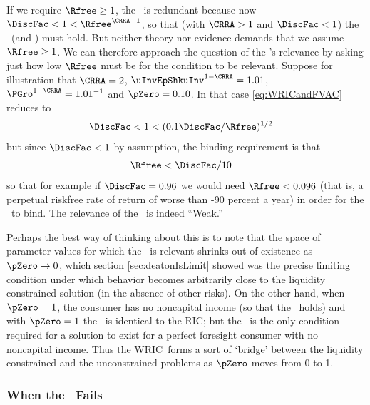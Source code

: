 \documentclass[BufferStockTheory]{subfiles}
\begin{document}
If we require $\Rfree \geq 1$, the \WRIC~is redundant because now $\DiscFac <1<\Rfree^{\CRRA-1}$, so that (with $\CRRA > 1$ and $\DiscFac<1$) the \RIC~(and \WRIC) must hold.  But neither theory nor evidence demands that we assume $\Rfree \geq
1$.  We can therefore approach the question of the \WRIC's relevance by
asking just how low $\Rfree$ must be for the condition to be relevant.
Suppose for illustration that $\CRRA=2$, $\uInvEpShkuInv^{1-\CRRA}=1.01$,
$\PGro^{1-\CRRA}=1.01^{-1}$ and $\pZero = 0.10$.  In that case
\eqref{eq:WRICandFVAC} reduces to
\begin{align*}
  \DiscFac  & < 1 < (0.1 \DiscFac/\Rfree)^{1/2} 
\end{align*}
but since $\DiscFac < 1$ by assumption, the binding requirement is that
\begin{align*}
  \Rfree  & < \DiscFac/10 \notag
\end{align*}
so that for example if $\DiscFac=0.96$ we would need $\Rfree < 0.096$
(that is, a perpetual riskfree rate of return of worse than -90
percent a year) in order for the \WRIC~to bind.
The relevance of the \WRIC~is indeed ``Weak.''

Perhaps the best way of thinking about this is to note that the space
of parameter values for which the \WRIC~is relevant shrinks out of
existence as $\pZero \rightarrow 0$, which section
\ref{sec:deatonIsLimit} showed was the precise limiting condition
under which behavior becomes arbitrarily close to the liquidity
constrained solution (in the absence of other risks).  On the other
hand, when $\pZero = 1$, the consumer has no noncapital income (so
that the \FHWC~holds) and with $\pZero=1$ the \WRIC~is identical to the
RIC; but the \RIC~is
the only condition required for a solution to exist
for a perfect foresight consumer with no noncapital income.  Thus the
WRIC~forms a sort of `bridge' between the liquidity constrained and
the unconstrained problems as $\pZero$ moves from 0 to 1.

\hypertarget{IntuitionRIC}{}
\subsubsection{When the \RIC~Fails}\label{subsubsec:WhenTheRICFails}
\end{document}
